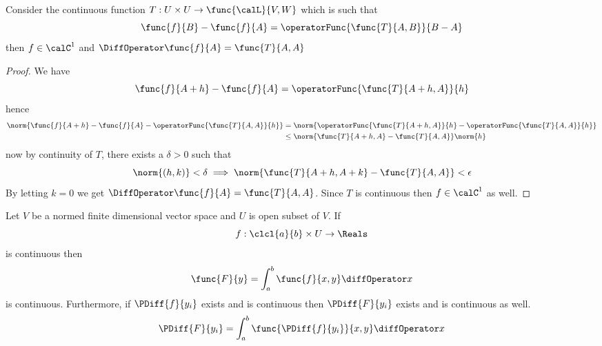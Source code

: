 \begin{theorem}
    Consider the continuous function \(T: U \times U \to \func{\calL}{V,W}\) which is such that
    \begin{equation*}
        \func{f}{B} - \func{f}{A} = \operatorFunc{\func{T}{A,B}}{B-A}
    \end{equation*}
    then \(f \in \calC^1\) and \(\DiffOperator \func{f}{A} = \func{T}{A,A}\)
\end{theorem}

\begin{proof}
    We have
    \begin{equation*}
        \func{f}{A + h} - \func{f}{A} = \operatorFunc{\func{T}{A+h,A}}{h}
    \end{equation*}
    hence
    \begin{align*}
        \norm{\func{f}{A + h} - \func{f}{A} - \operatorFunc{\func{T}{A,A}}{h}} & = \norm{ \operatorFunc{\func{T}{A+h,A}}{h} - \operatorFunc{\func{T}{A,A}}{h}} \\
                                                                               & \leq \norm{\func{T}{A+h,A} - \func{T}{A,A}}\norm{h}
    \end{align*}
    now by continuity of \(T\), there exists a \(\delta > 0\) such that
    \begin{equation*}
        \norm{(h,k)} < \delta \implies \norm{\func{T}{A+h,A+k} - \func{T}{A,A}} < \epsilon
    \end{equation*}
    By letting \(k = 0\) we get \(\DiffOperator \func{f}{A} = \func{T}{A,A}\). Since \(T\) is continuous then \(f \in \calC^1\) as well.
\end{proof}

\begin{corollary}
    Let \(V\) be a normed finite dimensional vector space and \(U\) is open subset of \(V\). If
    \begin{equation*}
        f :\clcl{a}{b} \times U \to \Reals
    \end{equation*}
    is continuous then
    \begin{equation*}
        \func{F}{y} = \int_{a}^{b} \func{f}{x,y} \diffOperator x
    \end{equation*}
    is continuous. Furthermore, if \(\PDiff{f}{y_i}\) exists and is continuous then \(\PDiff{F}{y_i}\) exists and is continuous as well.
    \begin{equation*}
        \PDiff{F}{y_i} =  \int_{a}^{b} \func{\PDiff{f}{y_i}}{x,y} \diffOperator x
    \end{equation*}
\end{corollary}

